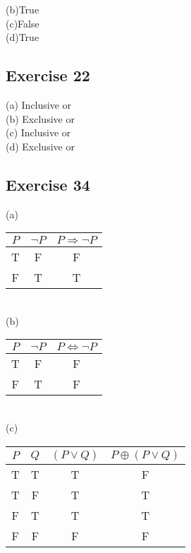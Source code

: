 \documentclass[12pt]{article}
\begin{document}
(b)True \\

(c)False\\

(d)True \\

\subsection*{Exercise 22}

(a) Inclusive or\\

(b) Exclusive or\\

(c) Inclusive or\\

(d) Exclusive or\\

\subsection*{Exercise 34}
(a)\\
\begin{tabular}{|c|c|c|}
\hline
$P$& $\neg P$& $P\Rightarrow \lnot P$\\
\hline 
T & F & F\\
\hline 
F & T & T\\
\hline 
\end{tabular}
\\

(b)\\
\begin{tabular}{|c|c|c|}
    \hline
    $P$& $\neg P$& $P\Leftrightarrow  \lnot P$\\
    \hline 
    T & F & F\\
    \hline 
    F & T & F\\
    \hline 
    \end{tabular}
\\

(c)
\begin{tabular}{|c|c|c|c|}
    \hline 
    $P$ & $Q$ & $(P\lor Q)$ & $P\oplus (P\lor Q)$\\
    \hline 
    T&T&T&F\\
    \hline 
    T & F & T & T \\
    \hline 
    F & T & T &T \\
    \hline 
    F & F & F & F \\
    \hline 
\end{tabular}
\\
\end{document}
